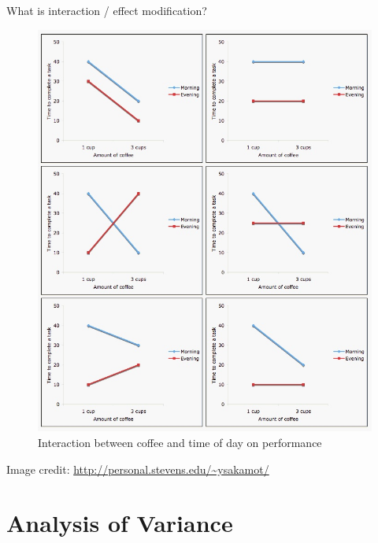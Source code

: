 \documentclass[
  ignorenonframetext,
]{beamer}
\begin{document}
\begin{frame}{What is interaction / effect modification?}
\protect\hypertarget{what-is-interaction-effect-modification}{}

\begin{figure}
\centering
\includegraphics{coffee_interaction.jpg}
\caption{Interaction between coffee and time of day on performance}
\end{figure}

Image credit: \url{http://personal.stevens.edu/~ysakamot/}

\end{frame}

\hypertarget{analysis-of-variance}{%
\section{Analysis of Variance}\label{analysis-of-variance}}
\end{document}
